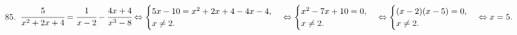 85. $\cfrac{5}{x^2+2x+4}=\cfrac{1}{x-2}-\cfrac{4x+4}{x^3-8}\Leftrightarrow \begin{cases} 5x-10=x^2+2x+4-4x-4,\\ x\neq2.\end{cases}
\Leftrightarrow \begin{cases} x^2-7x+10=0,\\ x\neq2.\end{cases}\Leftrightarrow \begin{cases} (x-2)(x-5)=0,\\ x\neq2.\end{cases}\Leftrightarrow
x=5.$\\
